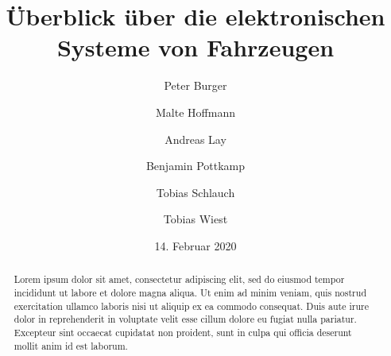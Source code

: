 \documentclass[]{article}
\title{Überblick über die elektronischen Systeme von Fahrzeugen}
\author{
	Peter Burger
	\and
	Malte Hoffmann
	\and
	Andreas Lay
	\and
	Benjamin Pottkamp
	\and
	Tobias Schlauch
	\and
	Tobias Wiest
}
\date{14. Februar 2020}
\begin{document}
\maketitle

\begin{abstract}
	Lorem ipsum dolor sit amet, consectetur adipiscing elit, sed do eiusmod tempor incididunt ut labore et dolore magna aliqua. Ut enim ad minim veniam, quis nostrud exercitation ullamco laboris nisi ut aliquip ex ea commodo consequat. Duis aute irure dolor in reprehenderit in voluptate velit esse cillum dolore eu fugiat nulla pariatur. Excepteur sint occaecat cupidatat non proident, sunt in culpa qui officia deserunt mollit anim id est laborum.
\end{abstract}
\newpage
\tableofcontents












\end{document}
